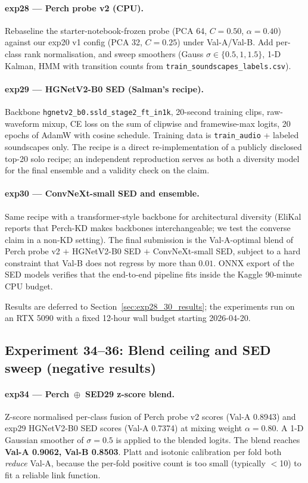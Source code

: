 \paragraph{exp28 --- Perch probe v2 (CPU).}
Rebaseline the starter-notebook-frozen probe (PCA 64, $C{=}0.50$,
$\alpha{=}0.40$) against our exp20 v1 config (PCA 32, $C{=}0.25$)
under Val-A/Val-B. Add per-class rank normalisation, and sweep
smoothers (Gauss $\sigma\in\{0.5,1,1.5\}$, 1-D Kalman, HMM with
transition counts from \texttt{train\_soundscapes\_labels.csv}).

\paragraph{exp29 --- HGNetV2-B0 SED (Salman's recipe).}
Backbone \texttt{hgnetv2\_b0.ssld\_stage2\_ft\_in1k},
20-second training clips, raw-waveform mixup, CE loss on the sum of
clipwise and framewise-max logits, 20 epochs of AdamW with cosine
schedule. Training data is \texttt{train\_audio} + labeled
soundscapes only. The recipe is a direct re-implementation of a
publicly disclosed top-20 solo recipe; an independent reproduction
serves as both a diversity model for the final ensemble and a
validity check on the claim.

\paragraph{exp30 --- ConvNeXt-small SED and ensemble.}
Same recipe with a transformer-style backbone for architectural
diversity (EliKal reports that Perch-KD makes backbones
interchangeable; we test the converse claim in a non-KD setting).
The final submission is the Val-A-optimal blend of Perch probe v2
$+$ HGNetV2-B0 SED $+$ ConvNeXt-small SED, subject to a hard
constraint that Val-B does not regress by more than $0.01$.
ONNX export of the SED models verifies that the end-to-end
pipeline fits inside the Kaggle 90-minute CPU budget.

Results are deferred to Section~\ref{sec:exp28_30_results}; the
experiments run on an RTX 5090 with a fixed 12-hour wall budget
starting 2026-04-20.

\subsection{Experiment 34--36: Blend ceiling and SED sweep (negative results)}
\label{sec:exp34_36}

\paragraph{exp34 --- Perch~$\oplus$~SED29 z-score blend.}
Z-score normalised per-class fusion of Perch probe v2 scores
(Val-A 0.8943) and exp29 HGNetV2-B0 SED scores (Val-A 0.7374) at
mixing weight $\alpha{=}0.80$. A 1-D Gaussian smoother of
$\sigma{=}0.5$ is applied to the blended logits. The blend reaches
\textbf{Val-A 0.9062, Val-B 0.8503}. Platt and isotonic calibration
per fold both \emph{reduce} Val-A, because the per-fold positive count
is too small (typically $<$10) to fit a reliable link function.

